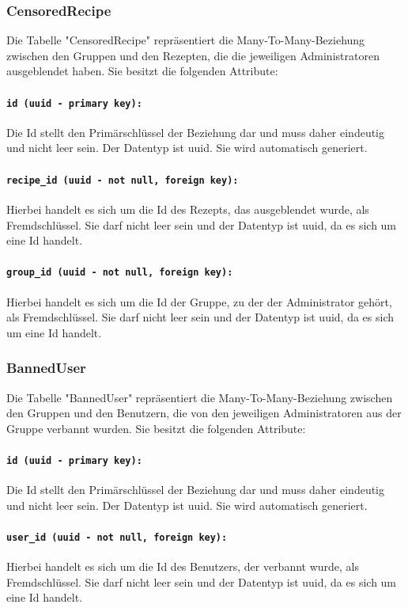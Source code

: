 \documentclass{entwurfsheft}
\begin{document}
\subsubsection{CensoredRecipe}
Die Tabelle "CensoredRecipe" repräsentiert die Many-To-Many-Beziehung zwischen den Gruppen und den Rezepten, die die jeweiligen Administratoren ausgeblendet haben. Sie besitzt die folgenden Attribute:
\paragraph{\texttt{id (uuid - primary key):}} Die Id stellt den Primärschlüssel der Beziehung dar und muss daher eindeutig und nicht leer sein. Der Datentyp ist \Gls{uuid}. Sie wird automatisch generiert.
\paragraph{\texttt{recipe\_id (uuid - not null, foreign key):}} Hierbei handelt es sich um die Id des Rezepts, das ausgeblendet wurde, als Fremdschlüssel. Sie darf nicht leer sein und der Datentyp ist \Gls{uuid}, da es sich um eine Id handelt.
\paragraph{\texttt{group\_id (uuid - not null, foreign key):}} Hierbei handelt es sich um die Id der Gruppe, zu der der Administrator gehört, als Fremdschlüssel. Sie darf nicht leer sein und der Datentyp ist \Gls{uuid}, da es sich um eine Id handelt.
\newpage

\subsubsection{BannedUser}
Die Tabelle "BannedUser" repräsentiert die Many-To-Many-Beziehung zwischen den Gruppen und den Benutzern, die von den jeweiligen Administratoren aus der Gruppe verbannt wurden. Sie besitzt die folgenden Attribute:
\paragraph{\texttt{id (uuid - primary key):}} Die Id stellt den Primärschlüssel der Beziehung dar und muss daher eindeutig und nicht leer sein. Der Datentyp ist \Gls{uuid}. Sie wird automatisch generiert.
\paragraph{\texttt{user\_id (uuid - not null, foreign key):}} Hierbei handelt es sich um die Id des Benutzers, der verbannt wurde, als Fremdschlüssel. Sie darf nicht leer sein und der Datentyp ist \Gls{uuid}, da es sich um eine Id handelt.
\end{document}
